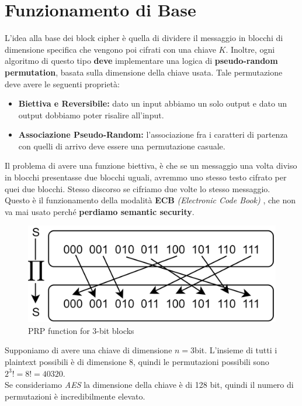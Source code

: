 \section{Funzionamento di Base}
L'idea alla base dei block cipher è quella di dividere il messaggio in blocchi di dimensione specifica che vengono poi cifrati con una chiave $K$. Inoltre, ogni algoritmo di questo tipo \textbf{deve} implementare una logica di \textbf{pseudo-random permutation}, basata sulla dimensione della chiave usata. Tale permutazione deve avere le seguenti proprietà:
\begin{property}
\begin{itemize}
    \item \textbf{Biettiva e Reversibile:} dato un input abbiamo un solo output e dato un output dobbiamo poter risalire all'input.
    \item \textbf{Associazione Pseudo-Random:} l'associazione fra i caratteri di partenza con quelli di arrivo deve essere una permutazione casuale. 
\end{itemize}
\end{property}
Il problema di avere una funzione biettiva, è che se un messaggio una volta diviso in blocchi presentasse due blocchi uguali, avremmo uno stesso testo cifrato per quei due blocchi. Stesso discorso se cifriamo due volte lo stesso messaggio.\\
Questo è il funzionamento della modalità \textbf{ECB} \textit{(Electronic Code Book)} , che non va mai usato perché \textbf{perdiamo semantic security}.
\begin{figure}[H]
    \centering
    \includegraphics[width=0.8\linewidth]{image/shortcycle.png}
    \caption{PRP function for 3-bit blocks}
    \label{fig:shortcycle}
\end{figure}
\begin{remark}Supponiamo di avere una chiave di dimensione $n=3$bit. L'insieme di tutti i plaintext possibili è di dimensione 8, quindi le permutazioni possibili sono $2^3!=8!=40320$.\\
Se consideriamo \textit{AES} la dimensione della chiave è di 128 bit, quindi il numero di permutazioni è incredibilmente elevato. 
\end{remark}
